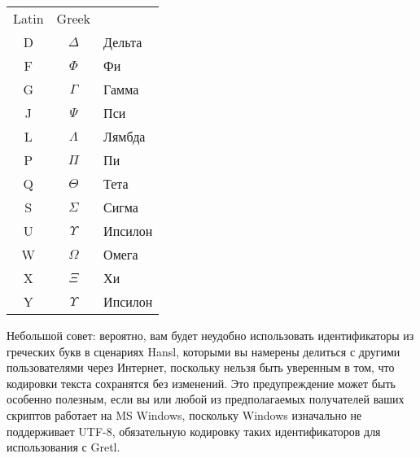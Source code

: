 \begin{center}
  \begin{tabular}{ccl}
    Latin & Greek \\[4pt]
    D & $\Delta$ & Дельта \\
    F & $\Phi$ & Фи \\
    G & $\Gamma$ & Гамма \\
    J & $\Psi$ & Пси \\
    L & $\Lambda$ & Лямбда \\
    P & $\Pi$ & Пи \\
    Q & $\Theta$ & Тета \\
    S & $\Sigma$ & Сигма \\
    U & $\Upsilon$ & Ипсилон \\
    W & $\Omega$ & Омега \\
    X & $\Xi$  & Хи \\
    Y & $\Upsilon$ & Ипсилон \\
  \end{tabular}
\end{center}

Небольшой совет: вероятно, вам будет неудобно использовать
идентификаторы из греческих букв в сценариях Hansl, которыми вы
намерены делиться с другими пользователями через Интернет, поскольку
нельзя быть уверенным в том, что кодировки текста сохранятся без
изменений. Это предупреждение может быть особенно полезным, если вы
или любой из предполагаемых получателей ваших скриптов работает на MS
Windows, поскольку Windows изначально не поддерживает UTF-8,
обязательную кодировку таких идентификаторов для использования с
Gretl.
